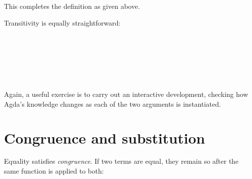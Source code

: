 This completes the definition as given above.

Transitivity is equally straightforward:

\begin{fence}
\begin{code}%
\>[0]\AgdaSpace{}%
\AgdaSymbol{:}\AgdaSpace{}%
\AgdaSpace{}%
\AgdaSymbol{\{}\AgdaSpace{}%
\AgdaSymbol{:}\AgdaSpace{}%
\AgdaSymbol{\}}\AgdaSpace{}%
\AgdaSymbol{\{}\AgdaSpace{}%
\AgdaSpace{}%
\AgdaSpace{}%
\AgdaSymbol{:}\AgdaSpace{}%
\AgdaSymbol{\}}\<%
\\
\>[0][@{}l@{\AgdaIndent{0}}]%
\>[2]\AgdaSpace{}%
\AgdaSpace{}%
\AgdaSpace{}%
\<%
\\
%
\>[2]%
\>[51I]\AgdaSpace{}%
\AgdaSpace{}%
\<%
\\
\>[.][@{}l@{}]\<[51I]%
\>[4]\AgdaComment{-----}\<%
\\
%
\>[2]\AgdaSpace{}%
\AgdaSpace{}%
\AgdaSpace{}%
\<%
\\
\>[0]\AgdaSpace{}%
\AgdaSpace{}%
%
\>[17]\AgdaSymbol{=}%
\>[20]\<%
\end{code}
\end{fence}

Again, a useful exercise is to carry out an interactive development,
checking how Agda's knowledge changes as each of the two arguments is
instantiated.

\hypertarget{Equality-cong}{%
\section{Congruence and substitution}\label{Equality-cong}}

Equality satisfies \emph{congruence}. If two terms are equal, they
remain so after the same function is applied to both:


